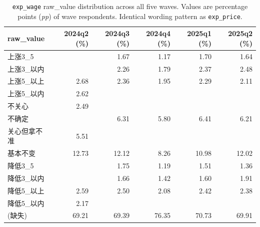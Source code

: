 \documentclass[11pt,letterpaper,english,final]{article}
\begin{document}
\begin{table}[H]
\centering
\small
\setlength{\tabcolsep}{5pt}
\caption{\texttt{exp\_wage} raw\_value distribution across all five waves. Values are percentage points (\textit{pp}) of wave respondents. Identical wording pattern as \texttt{exp\_price}.}
\label{tab:exp_wage_dist}
\begin{tabular}{@{}l r r r r r@{}}
\toprule
{raw\_value} & {2024q2 (\%)} & {2024q3 (\%)} & {2024q4 (\%)} & {2025q1 (\%)} & {2025q2 (\%)} \\
\midrule
上涨3\_5     &       & 1.67  & 1.17  & 1.70  & 1.64  \\
上涨3\_以内  &       & 2.26  & 1.79  & 2.37  & 2.48  \\
上涨5\_以上  & 2.68  & 2.36  & 1.95  & 2.29  & 2.11  \\
上涨5\_以内  & 2.62  &       &       &       &       \\
不关心      & 2.49  &       &       &       &       \\
不确定      &       & 6.31  & 5.80  & 6.41  & 6.21  \\
关心但拿不准 & 5.51  &       &       &       &       \\
基本不变    & 12.73 & 12.12 & 8.26  & 10.98 & 12.02 \\
降低3\_5     &       & 1.75  & 1.19  & 1.51  & 1.36  \\
降低3\_以内  &       & 1.66  & 1.42  & 1.60  & 1.91  \\
降低5\_以上  & 2.59  & 2.50  & 2.08  & 2.42  & 2.38  \\
降低5\_以内  & 2.17  &       &       &       &       \\
\midrule
(缺失)        & 69.21 & 69.39 & 76.35 & 70.73 & 69.91 \\
\bottomrule
\end{tabular}
\end{table}
\end{document}
